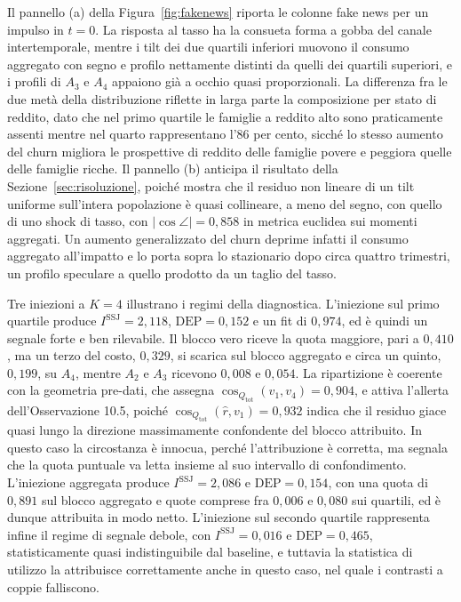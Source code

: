 \documentclass[11pt,a4paper]{article}
\newcommand{\DEP}{\mathrm{DEP}}
\begin{document}
Il pannello (a) della Figura~\ref{fig:fakenews} riporta le colonne fake news per un impulso in $t=0$. La risposta al tasso ha la consueta forma a gobba del canale intertemporale, mentre i tilt dei due quartili inferiori muovono il consumo aggregato con segno e profilo nettamente distinti da quelli dei quartili superiori, e i profili di $A_3$ e $A_4$ appaiono gi\`a a occhio quasi proporzionali. La differenza fra le due met\`a della distribuzione riflette in larga parte la composizione per stato di reddito, dato che nel primo quartile le famiglie a reddito alto sono praticamente assenti mentre nel quarto rappresentano l'$86$ per cento, sicch\'e lo stesso aumento del churn migliora le prospettive di reddito delle famiglie povere e peggiora quelle delle famiglie ricche. Il pannello (b) anticipa il risultato della Sezione~\ref{sec:risoluzione}, poich\'e mostra che il residuo non lineare di un tilt uniforme sull'intera popolazione \`e quasi collineare, a meno del segno, con quello di uno shock di tasso, con $\lvert\cos\angle\rvert=0{,}858$ in metrica euclidea sui momenti aggregati. Un aumento generalizzato del churn deprime infatti il consumo aggregato all'impatto e lo porta sopra lo stazionario dopo circa quattro trimestri, un profilo speculare a quello prodotto da un taglio del tasso.

Tre iniezioni a $K=4$ illustrano i regimi della diagnostica. L'iniezione sul primo quartile produce $I^{\mathrm{SSJ}}=2{,}118$, $\DEP=0{,}152$ e un fit di $0{,}974$, ed \`e quindi un segnale forte e ben rilevabile. Il blocco vero riceve la quota maggiore, pari a $0{,}410$, ma un terzo del costo, $0{,}329$, si scarica sul blocco aggregato e circa un quinto, $0{,}199$, su $A_4$, mentre $A_2$ e $A_3$ ricevono $0{,}008$ e $0{,}054$. La ripartizione \`e coerente con la geometria pre-dati, che assegna $\cos_{Q_{\mathrm{tot}}}(v_1,v_4)=0{,}904$, e attiva l'allerta dell'Osservazione 10.5, poich\'e $\cos_{Q_{\mathrm{tot}}}(\hat r,v_1)=0{,}932$ indica che il residuo giace quasi lungo la direzione massimamente confondente del blocco attribuito. In questo caso la circostanza \`e innocua, perch\'e l'attribuzione \`e corretta, ma segnala che la quota puntuale va letta insieme al suo intervallo di confondimento. L'iniezione aggregata produce $I^{\mathrm{SSJ}}=2{,}086$ e $\DEP=0{,}154$, con una quota di $0{,}891$ sul blocco aggregato e quote comprese fra $0{,}006$ e $0{,}080$ sui quartili, ed \`e dunque attribuita in modo netto. L'iniezione sul secondo quartile rappresenta infine il regime di segnale debole, con $I^{\mathrm{SSJ}}=0{,}016$ e $\DEP=0{,}465$, statisticamente quasi indistinguibile dal baseline, e tuttavia la statistica di utilizzo la attribuisce correttamente anche in questo caso, nel quale i contrasti a coppie falliscono.
\end{document}
